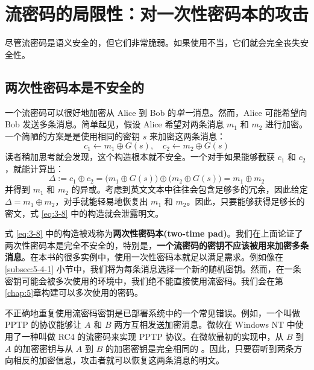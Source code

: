 \section{流密码的局限性：对一次性密码本的攻击}\label{sec:3-3}

尽管流密码是语义安全的，但它们非常脆弱。如果使用不当，它们就会完全丧失安全性。

\subsection{两次性密码本是不安全的}\label{subsec:3-3-1}

一个流密码可以很好地加密从 Alice 到 Bob 的\emph{单一}消息。然而，Alice 可能希望向 Bob 发送多条消息。简单起见，假设 Alice 希望对两条消息 $m_1$ 和 $m_2$ 进行加密。一个简陋的方案是是使用相同的密钥 $s$ 来加密这两条消息：
\begin{equation}\label{eq:3-8}
c_1\leftarrow m_1\oplus G(s),\quad
c_2\leftarrow m_2\oplus G(s)
\end{equation}
读者稍加思考就会发现，这个构造根本就不安全。一个对手如果能够截获 $c_1$ 和 $c_2$，就能计算出：
\[
\Delta
:=c_1\oplus c_2
=\big(m_1\oplus G(s)\big)\oplus\big(m_2\oplus G(s)\big)
=m_1\oplus m_2
\]
并得到 $m_1$ 和 $m_2$ 的异或。考虑到英文文本中往往会包含足够多的冗余，因此给定 $\Delta=m_1\oplus m_2$，对手就能轻易地恢复出 $m_1$ 和 $m_2$。因此，只要能够获得足够长的密文，式 \ref{eq:3-8} 中的构造就会泄露明文。

式 \ref{eq:3-8} 中的构造被戏称为\textbf{两次性密码本(two-time pad)}。我们在上面论证了两次性密码本是完全不安全的，特别是，\textbf{一个流密码的密钥不应该被用来加密多条消息}。在本书的很多实例中，使用一次性密码本就足以满足需求。例如像在 \ref{subsec:5-4-1} 小节中，我们将为每条消息选择一个新的随机密钥。然而，在一条密钥可能会被多次使用的环境中，我们绝不能直接使用流密码。我们会在第\ref{chap:5}章构建可以多次使用的密码。

不正确地重复使用流密码密钥是已部署系统中的一个常见错误。例如，一个叫做 PPTP 的协议能够让 $A$ 和 $B$ 两方互相发送加密消息。微软在 Windows NT 中使用了一种叫做 RC4 的流密码来实现 PPTP 协议。在微软最初的实现中，从 $B$ 到 $A$ 的加密密钥与从 $A$ 到 $B$ 的加密密钥是完全相同的 \cite{schneier1998cryptanalysis}。因此，只要窃听到两条方向相反的加密信息，攻击者就可以恢复这两条消息的明文。

